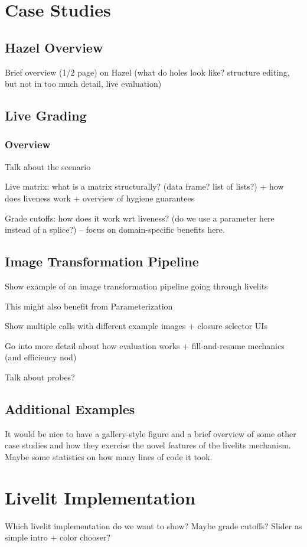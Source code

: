 \section{Case Studies}
\subsection{Hazel Overview}
Brief overview (1/2 page) on Hazel (what do holes look like? structure editing, but not in too much detail,
live evaluation)

\subsection{Live Grading}
\subsubsection{Overview}
Talk about the scenario

Live matrix: what is a matrix structurally? (data frame? list of lists?) + how does liveness work
+ overview of hygiene guarantees

Grade cutoffs: how does it work wrt liveness? (do we use a parameter here instead of a splice?) -- 
focus on domain-specific benefits here.

\subsection{Image Transformation Pipeline}
Show example of an image transformation pipeline going through livelits

This might also benefit from Parameterization

Show multiple calls with different example images + closure selector UIs

Go into more detail about how evaluation works + fill-and-resume mechanics (and efficiency nod)

Talk about probes?

\subsection{Additional Examples}
It would be nice to have a gallery-style figure and a brief overview of some other case studies
and how they exercise the novel features of the livelits mechanism. Maybe some statistics on how
many lines of code it took.

\section{Livelit Implementation}
Which livelit implementation do we want to show? Maybe grade cutoffs? Slider as simple intro + color chooser?

